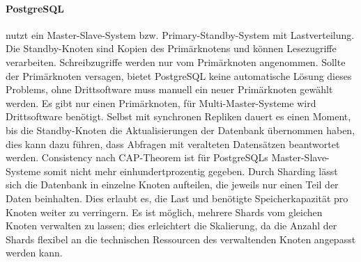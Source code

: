 \paragraph{PostgreSQL} nutzt ein Master-Slave-System bzw. Primary-Standby-System mit Lastverteilung.\cite{PG6} Die Standby-Knoten sind Kopien des Primärknotens und können Lesezugriffe verarbeiten. Schreibzugriffe werden nur vom Primärknoten angenommen. Sollte der Primärknoten versagen, bietet PostgreSQL keine automatische Lösung dieses Problems, ohne Drittsoftware muss manuell ein neuer Primärknoten gewählt werden. Es gibt nur einen Primärknoten, für Multi-Master-Systeme wird Drittsoftware benötigt. Selbst mit synchronen Repliken dauert es einen Moment, bis die Standby-Knoten die Aktualisierungen der Datenbank übernommen haben, dies kann dazu führen, dass Abfragen mit veralteten Datensätzen beantwortet werden.\cite{PG8} Consistency nach CAP-Theorem ist für PostgreSQLs Master-Slave-Systeme somit nicht mehr einhundertprozentig gegeben.
Durch Sharding lässt sich die Datenbank in einzelne Knoten aufteilen, die jeweils nur einen Teil der Daten beinhalten. Dies erlaubt es, die Last und benötigte Speicherkapazität pro Knoten weiter zu verringern. Es ist möglich, mehrere Shards vom gleichen Knoten verwalten zu lassen; dies erleichtert die Skalierung, da die Anzahl der Shards flexibel an die technischen Ressourcen des verwaltenden Knoten angepasst werden kann.
